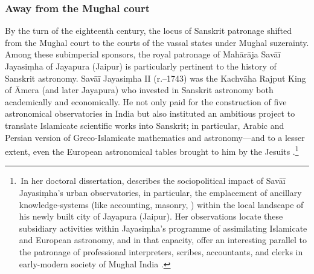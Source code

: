 \subsubsection{Away from the Mughal court} \label{away_Mughal_court}
By the turn of the eighteenth century, the locus of Sanskrit patronage shifted from the Mughal court to the courts of the vassal states under Mughal suzerainty. Among these subimperial sponsors, the royal patronage of Mahārāja Savāī Jayasiṃha of Jayapura (Jaipur) is particularly pertinent to the history of Sanskrit astronomy. Savāī Jayasiṃha II (r.--1743) was the Kachvāha Raj\-put King of Āmera (and later Jayapura) who invested in Sanskrit astronomy both academically and economically. He not only paid for the construction of five astronomical observatories in India but also instituted an ambitious project to translate Islamicate scientific works into Sanskrit; in particular, Arabic and Persian version of Greco-Islamicate mathematics and astronomy---and to a lesser extent, even the European astronomical tables brought to him by the Jesuits \parencites{SarmaJaiSinghSanskrit, PingreeAstronomersprogress}.\footnote{\,In her doctoral dissertation, \textcite{Johnson_Roehr} describes the sociopolitical impact of Savāī Jayasiṃha's urban observatories, in particular, the emplacement of ancillary knowledge-systems (like accounting, masonry, \etcp) within the local landscape of his newly built city of Jayapura (Jaipur). Her observations locate these subsidiary activities within Jayasiṃha's programme of assimilating Islamicate and European astronomy, and in that capacity, offer an interesting parallel to the patronage of professional interpreters, scribes, accountants, and clerks in early-modern society of Mughal India \parencite[\eg  \vid][Chapter~7 `The Making of a Munshī']{AlamSubramanyam}.} %

